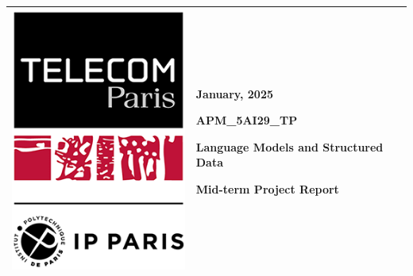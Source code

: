 \documentclass[12pt,a4paper]{article}
\begin{document}
\begin{center}
  \begin{tabular}{|p{}|p{}|}
    \hline
    {
    \vspace{0cm} %
    \centerline{\includegraphics[width=\linewidth]{tp-ipp.png}}
    }
    & {
      \vspace{0cm} %
      \centering
      \large
      {\hfill January, 2025}
      
      \vspace*{.5cm}
      \textbf{APM\_5AI29\_TP}
      
      \vspace*{.5cm}
      \setstretch{1.5}
      {\Large\textbf{Language Models and Structured Data}}
      
      \vspace*{.5cm}
      Mid-term Project Report

      \vspace*{1cm}
      } \\
    \hline
  \end{tabular}
\end{center}
\end{document}
